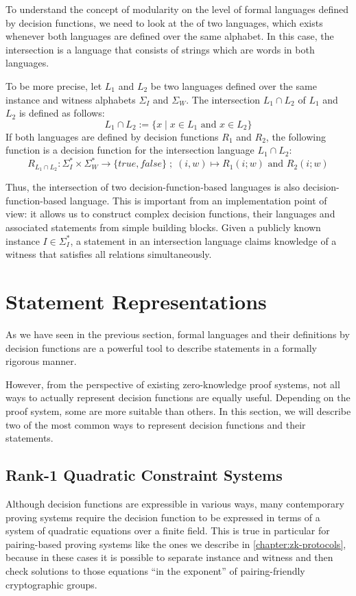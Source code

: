To understand the concept of modularity on the level of formal languages defined by decision functions, we need to look at the  of two languages, which exists whenever both languages are defined over the same alphabet. In this case, the intersection is a language that consists of strings which are words in both languages. 

To be more precise, let $L_1$ and $L_2$ be two languages defined over the same instance and witness alphabets $\Sigma_I$ and $\Sigma_W$.  The intersection $L_1 \cap L_2$ of $L_1$ and $L_2$ is defined as follows:
\begin{equation}
L_1 \cap L_2 := \{x\;|\; x\in L_1 \text{ and } x\in L_2\}
\end{equation} 
If both languages are defined by decision functions $R_1$ and $R_2$, the following function is a decision function for the intersection language $L_1 \cap L_2$:
\begin{equation}
R_{L_1 \cap L_2}: \Sigma_I^* \times \Sigma_W^* \to \{true, false\}\;;\;
(i,w) \mapsto R_1(i;w) \text{ and } R_2(i;w)
\end{equation}

Thus, the intersection of two decision-function-based languages is also decision-function-based language. This is important from an implementation point of view: it allows us to construct complex decision functions, their languages and associated statements from simple building blocks. Given a publicly known instance $I\in \Sigma_I^*$, a statement in an intersection language claims knowledge of a witness that satisfies all relations simultaneously. 

\section{Statement Representations}\label{sec:statement-representations}
As we have seen in the previous section, formal languages and their definitions by decision functions are a powerful tool to describe statements in a formally rigorous manner. 

However, from the perspective of existing zero-knowledge proof systems, not all ways to actually represent decision functions are equally useful. Depending on the proof system, some are more suitable than others. In this section, we will describe two of the most common ways to represent decision functions and their statements.
\subsection{Rank-1 Quadratic Constraint Systems}
\label{sec:R1CS}
Although decision functions are expressible in various ways, many contemporary proving systems require the decision function to be expressed in terms of a system of quadratic equations over a finite field. This is true in particular for pairing-based proving systems like the ones we describe in \chaptname{}  \ref{chapter:zk-protocols}, because in these cases it is possible to separate instance and witness and then check solutions to those equations ``in the exponent'' of pairing-friendly cryptographic groups.

